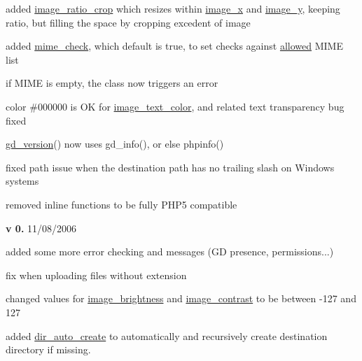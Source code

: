 \begin{DoxyItemize}
\begin{DoxyItemize}
\item added \hyperlink{}{image\+\_\+ratio\+\_\+crop} which resizes within \hyperlink{}{image\+\_\+x} and \hyperlink{}{image\+\_\+y}, keeping ratio, but filling the space by cropping excedent of image~\newline

\item added \hyperlink{}{mime\+\_\+check}, which default is true, to set checks against \hyperlink{}{allowed} M\+I\+M\+E list~\newline

\item if M\+I\+M\+E is empty, the class now triggers an error~\newline

\item color \#000000 is O\+K for \hyperlink{}{image\+\_\+text\+\_\+color}, and related text transparency bug fixed~\newline

\item \hyperlink{}{gd\+\_\+version}() now uses gd\+\_\+info(), or else phpinfo()~\newline

\item fixed path issue when the destination path has no trailing slash on Windows systems ~\newline

\item removed inline functions to be fully P\+H\+P5 compatible  
\end{DoxyItemize}
\item {\bfseries v 0.} 11/08/2006~\newline

\begin{DoxyItemize}
\item added some more error checking and messages (G\+D presence, permissions...)~\newline

\item fix when uploading files without extension~\newline

\item changed values for \hyperlink{}{image\+\_\+brightness} and \hyperlink{}{image\+\_\+contrast} to be between -\/127 and 127~\newline

\item added \hyperlink{}{dir\+\_\+auto\+\_\+create} to automatically and recursively create destination directory if missing.~\newline


\end{DoxyItemize}
\end{DoxyItemize}
